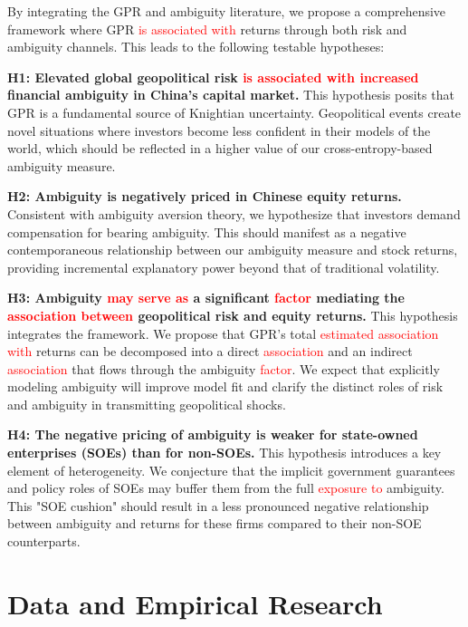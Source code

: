 \documentclass[preprint,12pt,authoryear]{elsarticle}
\begin{document}
By integrating the GPR and ambiguity literature, we propose a comprehensive framework where GPR \textcolor{red}{is associated with} returns through both risk and ambiguity channels. This leads to the following testable hypotheses:

\textbf{H1: Elevated global geopolitical risk \textcolor{red}{is associated with increased} financial ambiguity in China's capital market.}
This hypothesis posits that GPR is a fundamental source of Knightian uncertainty. Geopolitical events create novel situations where investors become less confident in their models of the world, which should be reflected in a higher value of our cross-entropy-based ambiguity measure.

\textbf{H2: Ambiguity is negatively priced in Chinese equity returns.}
Consistent with ambiguity aversion theory, we hypothesize that investors demand compensation for bearing ambiguity. This should manifest as a negative contemporaneous relationship between our ambiguity measure and stock returns, providing incremental explanatory power beyond that of traditional volatility.

\textbf{H3: Ambiguity \textcolor{red}{may serve as} a significant \textcolor{red}{factor} mediating the \textcolor{red}{association between} geopolitical risk and equity returns.}
This hypothesis integrates the framework. We propose that GPR's total \textcolor{red}{estimated association with} returns can be decomposed into a direct \textcolor{red}{association} and an indirect \textcolor{red}{association} that flows through the ambiguity \textcolor{red}{factor}. We expect that explicitly modeling ambiguity will improve model fit and clarify the distinct roles of risk and ambiguity in transmitting geopolitical shocks.

\textbf{H4: The negative pricing of ambiguity is weaker for state-owned enterprises (SOEs) than for non-SOEs.}
This hypothesis introduces a key element of heterogeneity. We conjecture that the implicit government guarantees and policy roles of SOEs may buffer them from the full \textcolor{red}{exposure to} ambiguity. This "SOE cushion" should result in a less pronounced negative relationship between ambiguity and returns for these firms compared to their non-SOE counterparts.


\section{Data and Empirical Research}
\label{sec:data}
\end{document}
